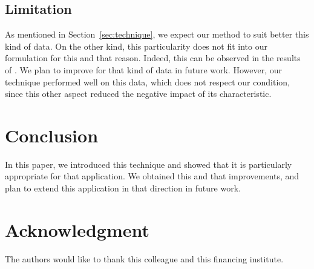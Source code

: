 \documentclass[10pt, conference]{IEEEtran}
\begin{document}
\subsection{Limitation}
%
As mentioned in Section~\ref{sec:technique}, we expect our method to suit better this kind of data. On the other kind, this particularity does not fit into our formulation for this and that reason. Indeed, this can be observed in the results of . 
We plan to improve for that kind of data in future work. However, our technique performed well on this data, which does not respect our condition, since this other aspect reduced the negative impact of its characteristic.


\section{Conclusion}
%
In this paper, we introduced this technique and showed that it is particularly appropriate for that application. We obtained this and that improvements, and plan to extend this application in that direction in future work.



\iffinal
\section*{Acknowledgment}
%
The authors would like to thank this colleague and this financing institute.
\fi







\end{document}
